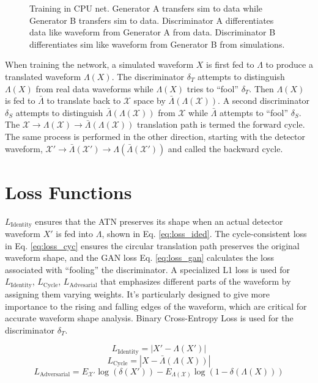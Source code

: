 \begin{figure}[htb!]
    \caption{Training in CPU net. Generator A transfers sim to data while Generator B transfers sim to data. Discriminator A differentiates data like waveform from Generator A from data. Discriminator B differentiates sim like waveform from Generator B from simulations.}
   \label{fig:network_training}
\end{figure}


When training the network, a simulated waveform $X$ is first fed to $\Lambda$ to produce a translated waveform $\Lambda(X)$. The discriminator $\delta_{T}$ attempts to distinguish $\Lambda(X)$ from real data waveforms while $\Lambda(X)$ tries to “fool” $\delta_{T}$. Then $\Lambda(X)$ is fed to $\bar{\Lambda}$ to translate back to $\mathcal{X}$ space by $\bar{\Lambda}(\Lambda(\mathcal{X}))$. A second discriminator $\delta_{S}$ attempts to distinguish $\bar{\Lambda}(\Lambda(\mathcal{X}))$ from $\mathcal{X}$ while $\bar{\Lambda}$ attempts to ``fool'' $\delta_{S}$. The $\mathcal{X}\rightarrow{}\Lambda(\mathcal{X})\rightarrow{}\bar{\Lambda}(\Lambda(\mathcal{X}))$ translation path is termed the forward cycle. The same process is performed in the other direction, starting with the detector waveform, $\mathcal{X}'\rightarrow{}\bar{\Lambda}(\mathcal{X}')\rightarrow{}\Lambda(\bar{\Lambda}(\mathcal{X}'))$ and called the backward cycle.

\section{Loss Functions}
$L_{\mathrm{Identity}}$ ensures that the ATN preserves its shape when an actual detector waveform $X'$ is fed into $\Lambda$, shown in Eq. \ref{eq:loss_ided}. The cycle-consistent loss in Eq. \ref{eq:loss_cyc} ensures the circular translation path preserves the original waveform shape, and the GAN loss Eq. \ref{eq:loss_gan} calculates the loss associated with ``fooling'' the discriminator. A specialized L1 loss is used for $L_{\mathrm{Identity}}$, $L_{\mathrm{Cycle}}$, $L_{\mathrm{Advesarial}}$ that emphasizes different parts of the waveform by assigning them varying weights. It's particularly designed to give more importance to the rising and falling edges of the waveform, which are critical for accurate waveform shape analysis. Binary Cross-Entropy Loss is used for the discriminator $\delta_{T}$.

\begin{equation}\label{eq:loss_ided}
    L_{\mathrm{Identity}} = |X' - \Lambda(X')|
\end{equation}
\begin{equation}\label{eq:loss_cyc}
    L_{\mathrm{Cycle}} = |X - \bar{\Lambda}(\Lambda(X))|
\end{equation}
\begin{equation}\label{eq:loss_gan}
    L_{\mathrm{Adversarial}} = E_{\mathcal{X'}}\log(\delta(X')) - E_{\Lambda(\mathcal{X})}\log(1 - \delta(\Lambda(X)))
\end{equation}

